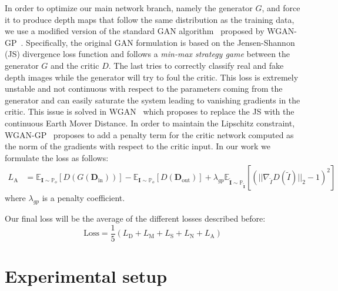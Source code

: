 \vspace{1mm}
 In order to optimize our main network branch, namely the generator $G$, and force it to produce depth maps that follow the same distribution as the training data, we use a modified version of the standard GAN algorithm~\cite{NIPS2014_5ca3e9b1} proposed by WGAN-GP~\cite{NIPS2017_892c3b1c}. Specifically, the original GAN formulation is based on the Jensen-Shannon (JS) divergence loss function and follows a \textit{min-max strategy game} between the generator $G$ and the critic $D$. The last tries to correctly classify real and fake depth images while the generator will try to foul the critic. This loss is extremely unstable and not continuous with respect to the parameters coming from the generator and can easily saturate the system leading to vanishing gradients in the critic. This issue is solved in WGAN~\cite{arjovsky2017wasserstein} which proposes to replace the JS with the continuous Earth Mover Distance. In order to maintain the Lipschitz constraint, WGAN-GP~\cite{NIPS2017_892c3b1c} proposes to add a penalty term for the critic network computed as the norm of the gradients with respect to the critic input. In our work we formulate the loss as follows:
\begin{align}
    L_\textrm{A} & = \mathbb{E}_{\textbf{I} \sim \mathbb{P}_o}[D(G(\mathbf{D}_{\textrm{in}}))] - \mathbb{E}_{\textbf{I} \sim \mathbb{P}_o}[D(\mathbf{D}_{\textrm{out}})] + \lambda_{gp} \mathbb{E}_{\tilde{\mathbf{I}} \sim \mathbb{P}_{\tilde{\mathbf{I}}}}[(|| \nabla_{\tilde{I}} D(\tilde{I}) ||_2 - 1) ^ 2]
\end{align}
where $\lambda_{gp}$ is a penalty coefficient.

\vspace{1mm}
 Our final loss will be the average of the different losses described before:
\begin{equation}
     \text{Loss} =\frac{1}{5}(L_{\textrm{D}} + L_{\textrm{M}} + L_{\textrm{S}} + L_{\textrm{N}} + L_{\textrm{A}}) 
\end{equation}

\section{Experimental setup}

